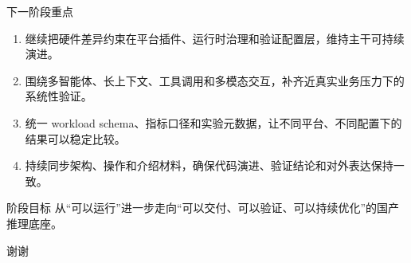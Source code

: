\documentclass[aspectratio=169,11pt,fontset=none]{ctexbeamer}
\begin{document}
\begin{frame}{下一阶段重点}
  \small
  \begin{enumerate}
    \item 继续把硬件差异约束在平台插件、运行时治理和验证配置层，维持主干可持续演进。
    \item 围绕多智能体、长上下文、工具调用和多模态交互，补齐近真实业务压力下的系统性验证。
    \item 统一 workload schema、指标口径和实验元数据，让不同平台、不同配置下的结果可以稳定比较。
    \item 持续同步架构、操作和介绍材料，确保代码演进、验证结论和对外表达保持一致。
  \end{enumerate}

  \begin{block}{阶段目标}
    从“可以运行”进一步走向“可以交付、可以验证、可以持续优化”的国产推理底座。
  \end{block}
\end{frame}

\begin{frame}[plain]
  \vfill
  \centering
  \Large 谢谢
\end{frame}
\end{document}

